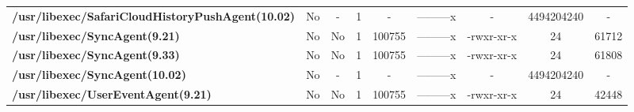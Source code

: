 \begin{center}
{\begin{tabular}{|>{\bfseries} l | C | C | C | C | C | C | C | C |}
					/usr/libexec/SafariCloudHistoryPushAgent(10.02) & No & - & 1 & - & ---------x & - & 4494204240 & -\\ 
					/usr/libexec/SyncAgent(9.21) & No & No & \color{green}1 & \color{red}100755 & \color{green}---------x & \color{red}-rwxr-xr-x & \color{green}24 & \color{red}61712\\ 
					/usr/libexec/SyncAgent(9.33) & No & No & \color{green}1 & \color{red}100755 & \color{green}---------x & \color{red}-rwxr-xr-x & \color{green}24 & \color{red}61808\\ 
					/usr/libexec/SyncAgent(10.02) & No & - & 1 & - & ---------x & - & 4494204240 & -\\ 
					/usr/libexec/UserEventAgent(9.21) & No & No & \color{green}1 & \color{red}100755 & \color{green}---------x & \color{red}-rwxr-xr-x & \color{green}24 & \color{red}42448\\ 

			\end{tabular}
		}
	\end{center}




